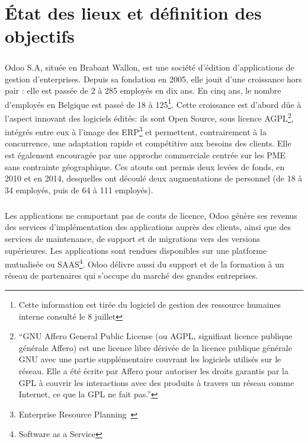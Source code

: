 \chapter{État des lieux et définition des objectifs}
\paragraph{}Odoo S.A, située en Brabant Wallon, est une société d’édition d'applications de gestion d'enterprises. Depuis sa fondation en 2005, elle jouit d'une croissance hors pair : elle est passée de 2 à 285 employés en dix ans. En cinq ans, le nombre d'employés en Belgique est passé de 18 à 125\footnote{Cette information est tirée du logiciel de gestion des ressource humaines interne consulté le 8 juillet}. Cette croissance est d'abord dûe à l’aspect innovant des logiciels édités: ils sont Open Source, sous licence AGPL\footnote{\enquote{GNU Affero General Public License (ou AGPL, signifiant licence publique générale Affero) est une licence libre dérivée de la licence publique générale GNU avec une partie supplémentaire couvrant les logiciels utilisés sur le réseau. Elle a été écrite par Affero pour autoriser les droits garantis par la GPL à couvrir les interactions avec des produits à travers un réseau comme Internet, ce que la GPL ne fait pas.}\cite{agpl}}, intégrés entre eux à l'image des ERP\footnote{Enterprise Resource Planning~\citep{wikierp}} et permettent, contrairement à la concurrence, une adaptation rapide et compétitive aux besoins des clients. Elle est également encouragée par une approche commerciale centrée sur les PME sans contrainte géographique. Ces atouts ont permis deux levées de fonds, en 2010 et en 2014, desquelles ont découlé deux augmentations de personnel (de 18 à 34 employés, puis de 64 à 111 employés). 

\paragraph{}Les applications ne comportant pas de couts de licence, Odoo génère ses revenus des services d’implémentation des applications auprès des clients, ainsi que des services de maintenance, de support et de migrations vers des versions supérieures. Les applications sont rendues disponibles sur une platforme mutualisée ou SAAS\footnote{Software as a Service}. Odoo délivre aussi du support et de la formation à un réseau de partenaires qui s'occupe du marché des grandes entreprises. 


